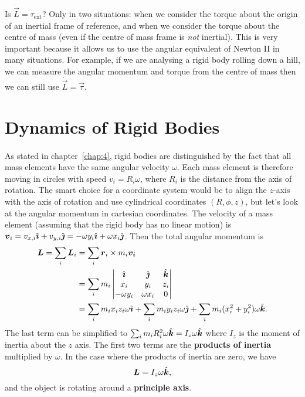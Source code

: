 \documentclass[../classical_mechanics.tex]{subfiles}
\begin{document}
        \paragraph{}
        Is $\dot{\vec{L}}=\tau_\text{ext}$?
        Only in two situations: when we consider the torque about the origin of an inertial frame of reference, and when we consider the torque about the centre of mass (even if the centre of mass frame is \textit{not} inertial).
        This is very important because it allows us to use the angular equivalent of Newton II in many situations.
        For example, if we are analysing a rigid body rolling down a hill, we can measure the angular momentum and torque from the centre of mass then we can still use $\dot{\vec{L}}=\vec{\tau}$.

    \section{Dynamics of Rigid Bodies}
        \paragraph{}
        As stated in chapter~\ref{chap:4}, rigid bodies are distinguished by the fact that all mass elements have the same angular velocity $\omega$.
        Each mass element is therefore moving in circles with speed $v_i=R_i\omega$, where $R_i$ is the distance from the axis of rotation.
        The smart choice for a coordinate system would be to align the $z$-axis with the axis of rotation and use cylindrical coordinates $(R,\phi,z)$, but let's look at the angular momentum in cartesian coordinates.
        The velocity of a mass element (assuming that the rigid body has no linear motion) is $\boldsymbol{v}_i=v_{x,i}\hat{\boldsymbol{\imath}}+v_{y,i}\hat{\boldsymbol{\jmath}}=-\omega y_i\hat{\boldsymbol{\imath}}+\omega x_i\hat{\boldsymbol{\jmath}}$.
        Then the total angular momentum is
        \begin{align}
            \boldsymbol{L}=\sum_i\boldsymbol{L}_i&=\sum_i\boldsymbol{r}_i\times m_i\boldsymbol{v_i}\\
            &=\sum_i m_i\begin{vmatrix}
                \hat{\boldsymbol{\imath}} & \hat{\boldsymbol{\jmath}} & \hat{\boldsymbol{k}} \\
                x_i & y_i & z_i \\
                -\omega y_i & \omega x_i & 0
            \end{vmatrix}\\
            &=\sum_i m_ix_iz_i\omega\hat{\boldsymbol{\imath}}+\sum_i m_iy_iz_i\omega\hat{\boldsymbol{\jmath}}+\sum_i m_i(x_i^2+y_i^2)\omega\hat{\boldsymbol{k}}.
        \end{align}
        The last term can be simplified to $\sum_i m_iR_i^2\omega\hat{\boldsymbol{k}}=I_z\omega\hat{\boldsymbol{k}}$ where $I_z$ is the moment of inertia about the $z$ axis.
        The first two terms are the \textbf{products of inertia} multiplied by $\omega$.
        In the case where the products of inertia are zero, we have
        \begin{equation}
            \boldsymbol{L}=I_z\omega\hat{\boldsymbol{k}},
        \end{equation}
        and the object is rotating around a \textbf{principle axis}.
\end{document}
